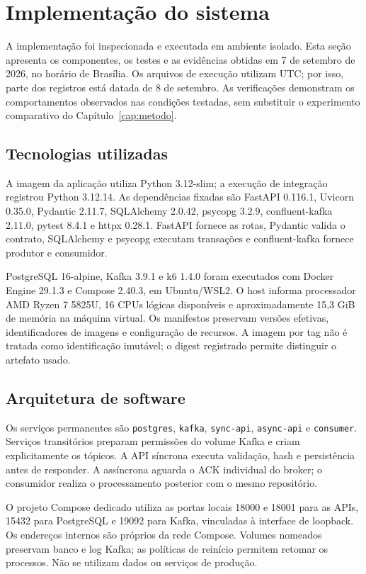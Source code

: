 \section{Implementação do sistema}
\label{sec:implementacao-real}
A implementação foi inspecionada e executada em ambiente isolado. Esta seção apresenta os componentes, os testes e as evidências obtidas em 7 de setembro de 2026, no horário de Brasília. Os arquivos de execução utilizam UTC; por isso, parte dos registros está datada de 8 de setembro. As verificações demonstram os comportamentos observados nas condições testadas, sem substituir o experimento comparativo do Capítulo~\ref{cap:metodo}.

\subsection{Tecnologias utilizadas}
A imagem da aplicação utiliza Python 3.12-slim; a execução de integração registrou Python 3.12.14. As dependências fixadas são FastAPI 0.116.1, Uvicorn 0.35.0, Pydantic 2.11.7, SQLAlchemy 2.0.42, psycopg 3.2.9, confluent-kafka 2.11.0, pytest 8.4.1 e httpx 0.28.1. FastAPI fornece as rotas, Pydantic valida o contrato, SQLAlchemy e psycopg executam transações e confluent-kafka fornece produtor e consumidor.

PostgreSQL 16-alpine, Kafka 3.9.1 e k6 1.4.0 foram executados com Docker Engine 29.1.3 e Compose 2.40.3, em Ubuntu/WSL2. O host informa processador AMD Ryzen 7 5825U, 16 CPUs lógicas disponíveis e aproximadamente 15,3 GiB de memória na máquina virtual. Os manifestos preservam versões efetivas, identificadores de imagens e configuração de recursos. A imagem por tag não é tratada como identificação imutável; o digest registrado permite distinguir o artefato usado.

\subsection{Arquitetura de software}
Os serviços permanentes são \texttt{postgres}, \texttt{kafka}, \texttt{sync-api}, \texttt{async-api} e \texttt{consumer}. Serviços transitórios preparam permissões do volume Kafka e criam explicitamente os tópicos. A API síncrona executa validação, hash e persistência antes de responder. A assíncrona aguarda o ACK individual do broker; o consumidor realiza o processamento posterior com o mesmo repositório.

O projeto Compose dedicado utiliza as portas locais 18000 e 18001 para as APIs, 15432 para PostgreSQL e 19092 para Kafka, vinculadas à interface de loopback. Os endereços internos são próprios da rede Compose. Volumes nomeados preservam banco e log Kafka; as políticas de reinício permitem retomar os processos. Não se utilizam dados ou serviços de produção.

